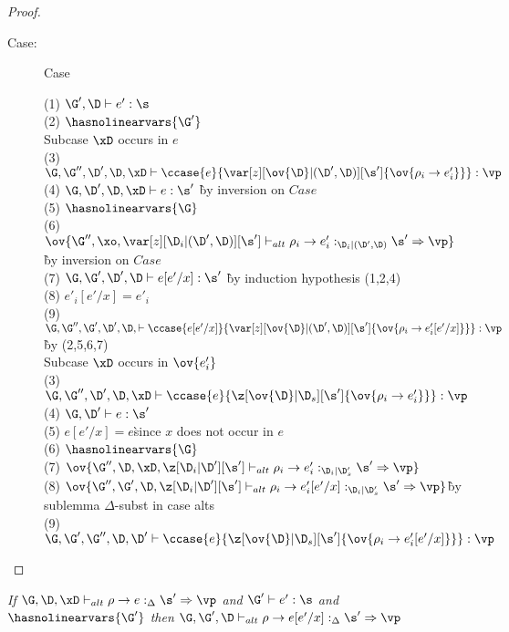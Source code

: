 \begin{proof}
\begin{description}
\item[Case:] Case
\begin{tabbing}
    (1) $\G', \D \vdash e' : \s$\\
    (2) $\hasnolinearvars{\G'}$\\
    Subcase $\xD$ occurs in $e$\\
    (3) $\G, \G'', \D', \D, \xD \vdash \ccase{e}{\var[z][\ov{\D}|(\D',\D)][\s'] \{\ov{\rho_i \to e'_i}\}} : \vp$\\
    (4) $\G, \D', \D, \xD \vdash e : \s'$ \` by inversion on $Case$\\
    (5) $\hasnolinearvars{\G}$\\
    (6) $\ov{\G'', \xo, \var[z][\D_i|(\D',\D)][\s'] \vdash_{alt} \rho_i \to e'_i :_{\D_i|(\D',\D)} \s' \Rightarrow \vp}$\` by inversion on $Case$\\
    (7) $\G, \G', \D', \D \vdash e[e'/x] : \s'$ \` by induction hypothesis (1,2,4)\\
    (8) $e'_i[e'/x]=e'_i$\\
    (9) $\G, \G'', \G', \D', \D, \vdash \ccase{e[e'/x]}{\var[z][\ov{\D}|(\D',\D)][\s'] \{\ov{\rho_i \to e'_i[e'/x]}\}} : \vp$\` by (2,5,6,7)\\
    Subcase $\xD$ occurs in $\ov{e'_i}$\\
    (3) $\G, \G'', \D', \D, \xD \vdash \ccase{e}{\z[\ov{\D}|\D_s][\s'] \{\ov{\rho_i \to e'_i}\}} : \vp$\\
    (4) $\G,\D' \vdash e : \s'$\\
    (5) $e[e'/x] = e$\`since $x$ does not occur in $e$\\
    (6) $\hasnolinearvars{\G}$\\
    (7) $\ov{\G'',\D,\xD,\z[\D_i|\D'][\s'] \vdash_{alt} \rho_i \to e'_i :_{\D_i|\D'_s} \s' \Rightarrow \vp}$\\
    (8) $\ov{\G'',\G',\D,\z[\D_i|\D'][\s'] \vdash_{alt} \rho_i \to e'_i[e'/x] :_{\D_i|\D'_s} \s' \Rightarrow \vp}$\`by sublemma $\Delta$-subst in case alts\\
    (9) $\G,\G',\G'',\D,\D' \vdash \ccase{e}{\z[\ov{\D}|\D_s][\s'] \{\ov{\rho_i \to e'_i[e'/x]}\}} : \vp$\\
\end{tabbing}

\end{description}

\end{proof}


\begin{sublemma}
\emph{If $\G, \D, \xD \vdash_{alt} \rho \to e :_\Delta \s' \Rightarrow \vp$ and $\G' \vdash e' : \s$ and
    $\hasnolinearvars{\G'}$ then $\G, \G', \D \vdash_{alt} \rho \to e[e'/x] :_\Delta \s' \Rightarrow \vp$}
\end{sublemma}

